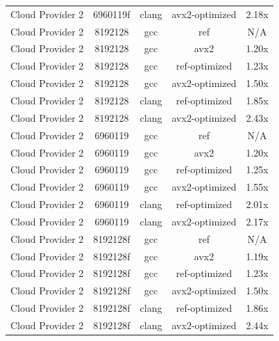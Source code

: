 \begin{table}[H]
\begin{tabularx}{\linewidth}{X c c c c}
            Cloud Provider 2 &             6960119f &                clang &       avx2-optimized &                2.18x\\
            Cloud Provider 2 &              8192128 &                  gcc &                  ref &                  N/A\\
            Cloud Provider 2 &              8192128 &                  gcc &                 avx2 &                1.20x\\
            Cloud Provider 2 &              8192128 &                  gcc &        ref-optimized &                1.23x\\
            Cloud Provider 2 &              8192128 &                  gcc &       avx2-optimized &                1.50x\\
            Cloud Provider 2 &              8192128 &                clang &        ref-optimized &                1.85x\\
            Cloud Provider 2 &              8192128 &                clang &       avx2-optimized &                2.43x\\
            Cloud Provider 2 &              6960119 &                  gcc &                  ref &                  N/A\\
            Cloud Provider 2 &              6960119 &                  gcc &                 avx2 &                1.20x\\
            Cloud Provider 2 &              6960119 &                  gcc &        ref-optimized &                1.25x\\
            Cloud Provider 2 &              6960119 &                  gcc &       avx2-optimized &                1.55x\\
            Cloud Provider 2 &              6960119 &                clang &        ref-optimized &                2.01x\\
            Cloud Provider 2 &              6960119 &                clang &       avx2-optimized &                2.17x\\
            Cloud Provider 2 &             8192128f &                  gcc &                  ref &                  N/A\\
            Cloud Provider 2 &             8192128f &                  gcc &                 avx2 &                1.19x\\
            Cloud Provider 2 &             8192128f &                  gcc &        ref-optimized &                1.23x\\
            Cloud Provider 2 &             8192128f &                  gcc &       avx2-optimized &                1.50x\\
            Cloud Provider 2 &             8192128f &                clang &        ref-optimized &                1.86x\\
            Cloud Provider 2 &             8192128f &                clang &       avx2-optimized &                2.44x\\
        \bottomrule
    \end{tabularx}
\end{table}

